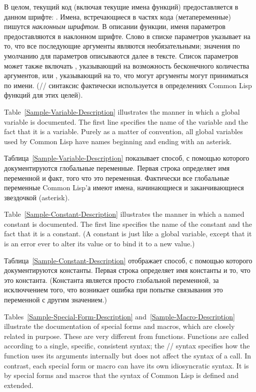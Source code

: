 В целом, текущий код (включая текущие имена функций) предоставляется в данном
шрифте: .
Имена, встречающиеся в частях кода (метапеременные) пишутся \textit{наклонным
шрифтом}. В описании функции, именя параметров предоставляются в наклонном
шрифте. Слово  в списке параметров указывает на то, что все
последующие аргументы являются необязательными; значения по умолчанию для
параметров описываются далее в тексте. Список параметров может также
включать , указывающий на возможность бесконечного количества
аргументов, или , указывающий на то, что могут аргументы могут
приниматься по имени.
(// синтаксис фактически используется в
определениях Common Lisp функций для этих целей).

Table~\ref{Sample-Variable-Description} illustrates the manner in
which a global variable is documented.  The first line specifies the
name of the variable and the fact that it is a variable.
Purely as a matter of convention, all global variables used
by Common Lisp have names beginning and ending with an asterisk.

Таблица~\ref{Sample-Variable-Description} показывает способ, с помощью которого
документируются глобальные переменные. Первая строка определяет имя переменной и 
факт, того что это переменная.
Фактически все глобальные переменные Common Lisp'а имеют имена, начинающиеся и
заканчивающиеся звездочкой (asterisk).


Table~\ref{Sample-Constant-Description} illustrates the manner in
which a named constant is documented.  The first line specifies the
name of the constant and the fact that it is a constant.
(A constant is just like a global variable, except that it is
an error ever to alter its value or to bind it to a new value.)

Таблица~\ref{Sample-Constant-Description} отображает способ, с помощью которого
документируются константы. Первая строка определяет имя константы и то, что это
константа.
(Константа является просто глобальной переменной, за исключчением того, что
возникает ошибка при попытке связывания это переменной с другим значением.)

Tables~\ref{Sample-Special-Form-Description}
and~\ref{Sample-Macro-Description} illustrate the documentation
of special forms and macros, which are closely related in purpose.
These are very different from functions.
Functions are called according to a single, specific, consistent syntax;
the // syntax specifies how the function uses its arguments
internally but does not affect the syntax of a call.
In contrast, each special form or macro can have its own idiosyncratic syntax.
It is by special forms and macros that the syntax of Common Lisp is defined
and extended.

